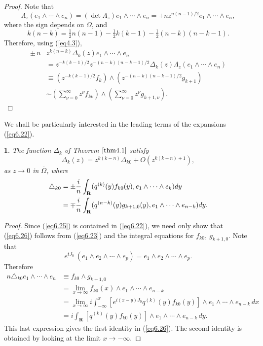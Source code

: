 \documentclass{surv-l}
\theoremstyle{plain}
\newtheorem{cor}[theorem]{\sc{Corollary}}
\theoremstyle{definition}
\numberwithin{equation}{chapter}
\begin{document}
\begin{proof}
Note that
\begin{equation*}
\Lambda_{z}(e_{1}\wedge\cdots\wedge e_{n})=(\det\Lambda_{z})e_{1}\wedge\cdots\wedge e_{n}=\pm nz^{n(n-1)/2}e_{1}\wedge\cdots\wedge e_{n},
\end{equation*}
where the sign depends on $\Omega$, and
\begin{equation*}
k(n-k)=\tfrac{1}{2}n(n-1)-\tfrac{1}{2}k(k-1)-\tfrac{1}{2}(n-k)(n-k-1).
\end{equation*}
Therefore, using (\ref{eq4.3}),
\begin{align*}
\pm\, n&z^{k(n-k)}\Delta_{k}(z)e_{1}\wedge\cdots\wedge e_{n}\\
&=z^{-k(k-1)/2}z^{-(n-k)(n-k-1)/2}\Delta_{k}(z)\Lambda_{z}(e_{1}\wedge\cdots \wedge e_{n})\\
&\equiv(z^{-k(k-1)/2}f_{k})\wedge(z^{-(n-k)(n-k-1)/2}g_{k+1})\\
&\sim\left(\sum_{\nu=0}^{\infty}z^{\nu}f_{k\nu}\right)\wedge\left(\sum_{\nu=0}^{\infty}z^{\nu}g_{k+1,\nu}\right).
\end{align*}
\end{proof}

We shall be particularly interested in the leading terms of the expansions (\ref{eq6.22}).
\setcounter{theorem}{23}
\begin{cor}\label{chap01:coro6.24}
The function $\Delta_{k}$ of Theorem $\ref{thm4.1}$ satisfy
\setcounter{equation}{24}
\begin{equation}\label{eq6.25}
\Delta_{k}(z)=z^{k(k-n)}\Delta_{k0}+O(z^{k(k-n)+1}),
\end{equation}
as $z\rightarrow 0$ in $\overline{\Omega}$, where
\begin{align}\label{eq6.26}
\triangle_{k0}&=\pm\frac{i}{n}\int_{\mathbf{R}}(q^{(k)}(y)f_{k0}(y), e_{1}\wedge\cdots\wedge e_{k})dy\\
&=\mp\frac{i}{n}\int_{\mathbf{R}}(q^{(n-k)}(y)g_{k+1,0}(y), e_{1}\wedge\cdots\wedge e_{n-k})dy.\notag
\end{align}
\end{cor}
\begin{proof}
Since (\ref{eq6.25}) is contained in (\ref{eq6.22}), we need only show that (\ref{eq6.26}) follows from (\ref{eq6.23}) and the integral equations for $f_{k0},\ g_{k+1,0}$. Note that
\begin{equation*}
e^{tJ_{0}}\ (e_{1}\wedge e_{2}\wedge\cdots\wedge e_{p})=e_{1}\wedge e_{2}\wedge\cdots\wedge e_{p}.
\end{equation*}
Therefore
\begin{align*}
n\triangle_{k0}e_{1}\wedge\cdots\wedge e_{n}&\equiv f_{k0}\wedge g_{k+1,0}\\
&=\lim_{x\rightarrow\infty}f_{k0}(x)\wedge e_{1}\wedge\cdots\wedge e_{n-k}\\
&=\lim_{x\rightarrow\infty}i\int_{-\infty}^{x}[e^{i(x-y)J_{0}}q^{(k)}(y)f_{k0}(y)]\wedge e_{1}\wedge\cdots\wedge e_{n-k}\,dx\\
&=i\int_{\mathbf{R}}[q^{(k)}(y)f_{k0}(y)]\wedge e_{1}\wedge\cdots\wedge e_{n-k}\,dy.
\end{align*}
This last expression gives the first identity in (\ref{eq6.26}). The second identity is obtained by looking at the limit $ x\rightarrow-\infty$.
\end{proof}
\end{document}
